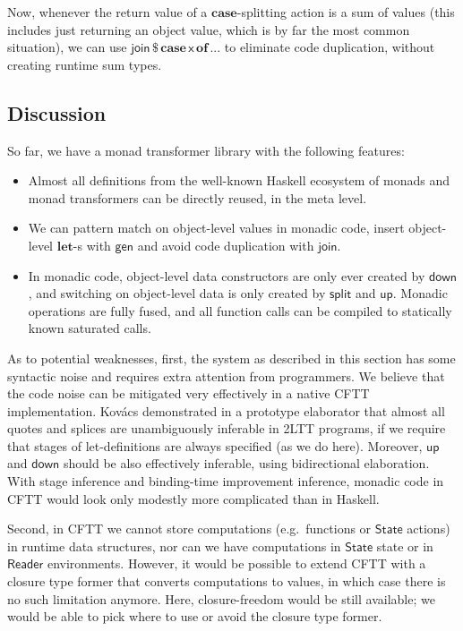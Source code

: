 \documentclass[acmsmall,screen,review,anonymous]{acmart}
\newcommand{\mit}[1]{{\mathsf{#1}}}
\newcommand{\msf}[1]{{\mathsf{#1}}}
\newcommand{\mbf}[1]{{\mathbf{#1}}}
\newcommand{\of}{\mbf{of}\,}
\newcommand{\vx}{\mathsf{x}}
\newcommand{\Reader}{\msf{Reader}}
\newcommand{\case}{\mbf{case\,}}
\theoremstyle{remark}
\newcommand{\mup}{\mit{up}}
\newcommand{\mdown}{\mit{down}}
\newcommand{\gen}{\mit{gen}}
\newcommand{\dlr}{\,\$\,}
\newcommand{\State}{\msf{State}}
\newcommand{\join}{\mit{join}}
\begin{document}
Now, whenever the return value of a $\mbf{case}$-splitting action is a sum of
values (this includes just returning an object value, which is by far the most
common situation), we can use $\join \dlr \case \vx\,\of ...$ to eliminate code
duplication, without creating runtime sum types.


\subsection{Discussion}

So far, we have a monad transformer library with the following features:
\begin{itemize}
\item Almost all definitions from the well-known Haskell ecosystem of monads and monad transformers
      can be directly reused, in the meta level.
\item We can pattern match on object-level values in monadic code, insert object-level $\mbf{let}$-s
      with $\gen$ and avoid code duplication with $\join$.
\item In monadic code, object-level data constructors are only ever created by
      $\mdown$, and switching on object-level data is only created by $\mit{split}$
      and $\mup$. Monadic operations are fully fused, and all function calls can be
      compiled to statically known saturated calls.
\end{itemize}

As to potential weaknesses, first, the system as described in this section has
some syntactic noise and requires extra attention from programmers.  We believe
that the code noise can be mitigated very effectively in a native CFTT
implementation. Kovács \cite{TODO} demonstrated in a prototype elaborator that
almost all quotes and splices are unambiguously inferable in 2LTT programs, if
we require that stages of let-definitions are always specified (as we do
here). Moreover, $\mup$ and $\mdown$ should be also effectively inferable, using
bidirectional elaboration. With stage inference and binding-time improvement
inference, monadic code in CFTT would look only modestly more complicated than
in Haskell.

Second, in CFTT we cannot store computations (e.g.\ functions or $\State$
actions) in runtime data structures, nor can we have computations in $\State$
state or in $\Reader$ environments. However, it would be possible to extend CFTT
with a closure type former that converts computations to values, in which case
there is no such limitation anymore. Here, closure-freedom would be still
available; we would be able to pick where to use or avoid the closure type
former.
\end{document}
